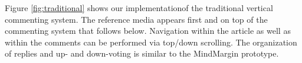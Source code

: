 Figure \ref{fig:traditional} shows our implementationof the traditional vertical commenting system. The reference media appears first and on top of the commenting system that follows below. Navigation within the article as well as within the comments can be performed via top/down scrolling. The organization of replies and up- and down-voting is similar to the MindMargin prototype.

